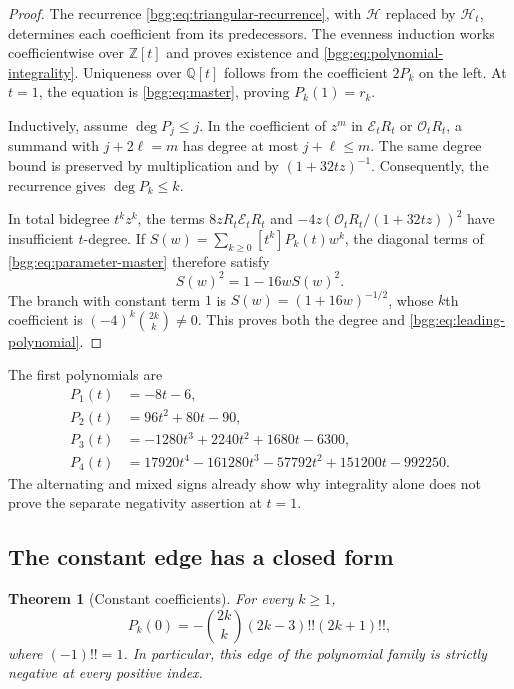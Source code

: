 \documentclass[11pt,a4paper]{article}
\numberwithin{equation}{section}
\newtheorem{theorem}{Theorem}[section]
\theoremstyle{definition}
\theoremstyle{remark}
\theoremstyle{definition}
\newcommand{\Z}{\mathbb Z}
\newcommand{\Q}{\mathbb Q}
\newcommand{\Eop}{\mathcal E}
\newcommand{\Oop}{\mathcal O}
\newcommand{\Hop}{\mathcal H}
\begin{document}
\begin{proof}
The recurrence \eqref{bgg:eq:triangular-recurrence}, with $\Hop$ replaced by
$\Hop_t$, determines each coefficient from its predecessors. The evenness
induction works coefficientwise over $\Z[t]$ and proves existence and
\eqref{bgg:eq:polynomial-integrality}. Uniqueness over $\Q[t]$ follows from the
coefficient $2P_k$ on the left. At $t=1$, the equation is
\eqref{bgg:eq:master}, proving $P_k(1)=r_k$.

Inductively, assume $\deg P_j\le j$. In the coefficient of $z^m$ in
$\Eop_tR_t$ or $\Oop_tR_t$, a summand with $j+2\ell=m$ has degree at most
$j+\ell\le m$. The same degree bound is preserved by multiplication and by
$(1+32tz)^{-1}$. Consequently, the recurrence gives $\deg P_k\le k$.

In total bidegree $t^kz^k$, the terms $8zR_t\Eop_tR_t$ and
$-4z(\Oop_tR_t/(1+32tz))^2$ have insufficient $t$-degree. If
$S(w)=\sum_{k\ge0}[t^k]P_k(t)w^k$, the diagonal terms of
\eqref{bgg:eq:parameter-master} therefore satisfy
\[
 S(w)^2=1-16wS(w)^2.
\]
The branch with constant term $1$ is $S(w)=(1+16w)^{-1/2}$, whose $k$th
coefficient is $(-4)^k\binom{2k}{k}\ne0$. This proves both the degree and
\eqref{bgg:eq:leading-polynomial}.
\end{proof}

The first polynomials are
\begin{align*}
 P_1(t)&=-8t-6,\\
 P_2(t)&=96t^2+80t-90,\\
 P_3(t)&=-1280t^3+2240t^2+1680t-6300,\\
 P_4(t)&=17920t^4-161280t^3-57792t^2+151200t-992250.
\end{align*}
The alternating and mixed signs already show why integrality alone does not
prove the separate negativity assertion at $t=1$.

\subsection{The constant edge has a closed form}

\begin{theorem}[Constant coefficients]\label{bgg:thm:constant-edge}
For every $k\ge1$,
\begin{equation}\label{bgg:eq:constant-polynomial}
 P_k(0)=-\binom{2k}{k}(2k-3)!!(2k+1)!!,
\end{equation}
where $(-1)!!=1$. In particular, this edge of the polynomial family is
strictly negative at every positive index.
\end{theorem}
\end{document}

